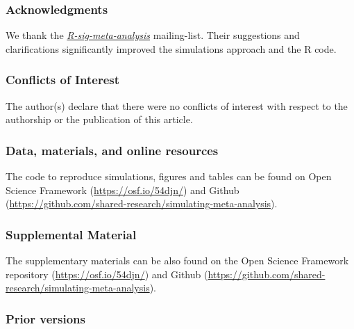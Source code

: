 \documentclass[
  man,floatsintext]{apa6}
\begin{document}
\newpage

\hypertarget{acknowledgments}{%
\subsubsection*{Acknowledgments}\label{acknowledgments}}

We thank the \emph{\href{https://stat.ethz.ch/mailman/listinfo/r-sig-meta-analysis}{R-sig-meta-analysis}} mailing-list. Their suggestions and clarifications significantly improved the simulations approach and the R code.

\hypertarget{conflicts-of-interest}{%
\subsubsection*{Conflicts of Interest}\label{conflicts-of-interest}}

The author(s) declare that there were no conflicts of interest with respect to the authorship or the publication of this article.

\hypertarget{data-materials-and-online-resources}{%
\subsubsection*{Data, materials, and online resources}\label{data-materials-and-online-resources}}

The code to reproduce simulations, figures and tables can be found on Open Science Framework (\url{https://osf.io/54djn/}) and Github (\url{https://github.com/shared-research/simulating-meta-analysis}).

\hypertarget{supplemental-material}{%
\subsubsection*{Supplemental Material}\label{supplemental-material}}

The supplementary materials can be also found on the Open Science Framework repository (\url{https://osf.io/54djn/}) and Github (\url{https://github.com/shared-research/simulating-meta-analysis}).

\hypertarget{prior-versions}{%
\subsubsection*{Prior versions}\label{prior-versions}}
\end{document}
